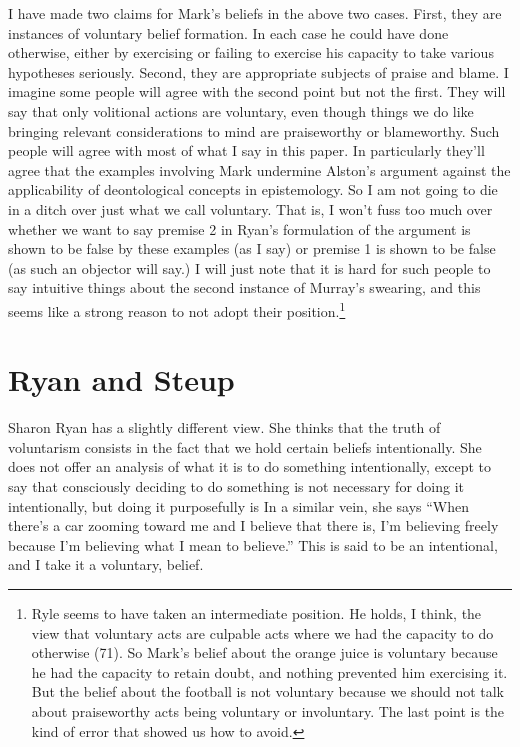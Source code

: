 I have made two claims for Mark's beliefs in the above two cases. First, they are instances of voluntary belief formation. In each case he could have done otherwise, either by exercising or failing to exercise his capacity to take various hypotheses seriously. Second, they are appropriate subjects of praise and blame. I imagine some people will agree with the second point but not the first. They will say that only volitional actions are voluntary, even though things we do like bringing relevant considerations to mind are praiseworthy or blameworthy. Such people will agree with most of what I say in this paper. In particularly they'll agree that the examples involving Mark undermine Alston's argument against the applicability of deontological concepts in epistemology. So I am not going to die in a ditch over just what we call voluntary. That is, I won't fuss too much over whether we want to say premise 2 in Ryan's formulation of the argument is shown to be false by these examples (as I say) or premise 1 is shown to be false (as such an objector will say.) I will just note that it is hard for such people to say intuitive things about the second instance of Murray's swearing, and this seems like a strong reason to not adopt their position.\footnote{Ryle seems to have taken an intermediate position. He holds, I think, the view that voluntary acts are culpable acts where we had the capacity to do otherwise (71). So Mark's belief about the orange juice is voluntary because he had the capacity to retain doubt, and nothing prevented him exercising it. But the belief about the football is not voluntary because we should not talk about praiseworthy acts being voluntary or involuntary. The last point is the kind of error that \cite[Ch.1]{Grice1989} showed us how to avoid.}

\section{Ryan and Steup} 

Sharon Ryan has a slightly different view. She thinks that the truth of voluntarism consists in the fact that we hold certain beliefs intentionally. She does not offer an analysis of what it is to do something intentionally, except to say that consciously deciding to do something is not necessary for doing it intentionally, but doing it purposefully is \cite[70-71]{Ryan2003} In a similar vein, she says ``When there's a car zooming toward me and I believe that there is, I'm believing freely because I'm believing what I mean to believe.'' \cite[74]{Ryan2003} This is said to be an intentional, and I take it a voluntary, belief.

